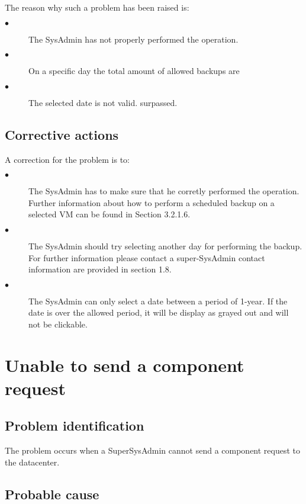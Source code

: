 The reason why such a problem has been raised is:\\
\begin{description}
\item[$\bullet$] The SysAdmin has not properly performed the operation.
\item[$\bullet$] On a specific day the total amount of allowed backups are
\item[$\bullet$] The selected date is not valid.
surpassed.
\end{description}


\subsection{Corrective actions}

A correction for the problem is to:\\
\begin{description}
\item[$\bullet$] The SysAdmin has to make sure that he corretly performed the
operation. Further information about how to perform a scheduled backup on a
selected VM can be found in Section 3.2.1.6.
\item[$\bullet$] The SysAdmin should try selecting another day for performing
the backup. For further information please contact a super-SysAdmin contact
information are provided in section 1.8.
\item[$\bullet$] The SysAdmin can only select a date between a period of 1-year.
If the date is over the allowed period, it will be display as grayed out and
will not be clickable.
\end{description}







\section{Unable to send a component request}

\subsection{Problem identification}
The problem occurs when a SuperSysAdmin cannot send a component request to the
datacenter.

\subsection{Probable cause}

